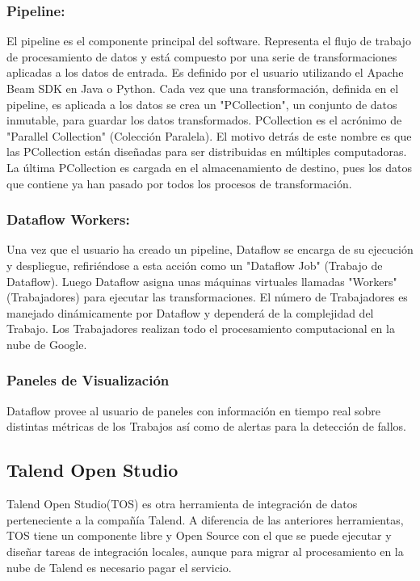 \subsubsection{Pipeline:}

El pipeline es el componente principal del software. Representa el flujo de trabajo de procesamiento de datos y est\'a 
compuesto por una serie de transformaciones aplicadas a los datos de entrada. Es definido por el usuario utilizando el 
Apache Beam SDK en Java o Python. Cada vez que una transformación, definida en el pipeline, es aplicada a los datos se crea 
un "PCollection", un conjunto de datos inmutable, para guardar los datos transformados. PCollection es el acrónimo de 
"Parallel Collection" (Colección 
Paralela). El motivo detrás de este nombre es que las PCollection están diseñadas para ser distribuidas en múltiples 
computadoras. La \'ultima PCollection es cargada en el almacenamiento de destino, pues los datos que contiene ya han pasado 
por todos los procesos de transformación. 

\subsubsection{Dataflow Workers:}

Una vez que el usuario ha creado un pipeline, Dataflow se encarga de su ejecución y despliegue, refiriéndose a esta 
acción como un "Dataflow Job" (Trabajo de Dataflow). Luego Dataflow asigna unas máquinas virtuales llamadas "Workers" 
(Trabajadores) para ejecutar las transformaciones. El n\'umero de Trabajadores es manejado din\'amicamente por Dataflow 
y depender\'a de la complejidad del Trabajo. Los Trabajadores realizan todo el procesamiento computacional en la nube 
de Google.

\subsubsection{Paneles de Visualizaci\'on}

Dataflow provee al usuario de paneles con información en tiempo real sobre distintas métricas de los Trabajos as\'i 
como de alertas para la detección de fallos.





\subsection{Talend Open Studio}

Talend Open Studio(TOS) es otra herramienta de integración de datos perteneciente a la compañía Talend. A diferencia de las 
anteriores herramientas, TOS tiene un componente libre y Open Source con el que se puede ejecutar y diseñar tareas de 
integración locales, aunque para migrar al procesamiento en la nube de Talend es necesario pagar el servicio. 

